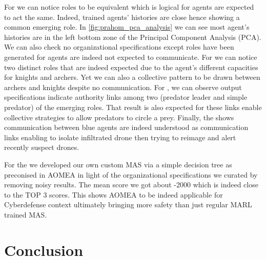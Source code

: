 \documentclass[runningheads]{llncs}
\begin{document}
For  we can notice roles to be equivalent which is logical for agents are expected to act the same. Indeed, trained agents' histories are close hence showing a common emerging role. In \autoref{fig:prahom_pca_analysis} we can see most agent's histories are in the left bottom zone of the Principal Component Analysis (PCA). We can also check no organizational specifications except roles have been generated for agents are indeed not expected to communicate. For  we can notice two distinct roles that are indeed expected due to the agent's different capacities for knights and archers. Yet we can also a collective pattern to be drawn between archers and knights despite no communication. For , we can observe output specifications indicate authority links among two (predator leader and simple predator) of the emerging roles. That result is also expected for these links enable collective strategies to allow predators to circle a prey. Finally, the  shows communication between blue agents are indeed understood as communication links enabling to isolate infiltrated drone then trying to reimage and alert recently suspect drones.

For the  we developed our own custom MAS via a simple decision tree as preconised in AOMEA in light of the organizational specifications we curated by removing noisy results. The mean score we got about -2000 which is indeed close to the TOP 3 scores. This shows AOMEA to be indeed applicable for Cyberdefense context ultimately bringing more safety than just regular MARL trained MAS.

\section{Conclusion}


\end{document}
